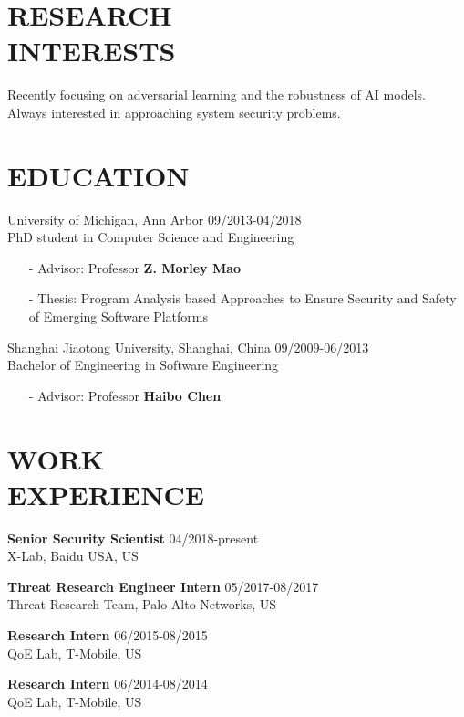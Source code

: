 \documentclass[margin]{res}
\begin{document}
\begin{resume}


\section{RESEARCH \\ INTERESTS}

Recently focusing on adversarial learning and the robustness of AI models. \\
Always interested in approaching system security problems. 

\section{EDUCATION} 
University of Michigan, Ann Arbor \hfill 09/2013-04/2018 \\
PhD student in Computer Science and Engineering
\begin{itemize}
\item[-] Advisor: Professor \textbf{Z. Morley Mao}
\item[-] Thesis: Program Analysis based Approaches to Ensure Security and Safety of Emerging Software Platforms
\end{itemize}

Shanghai Jiaotong University, Shanghai, China \hfill 09/2009-06/2013 \\
Bachelor of Engineering in Software Engineering
\begin{itemize}
\item[-] Advisor: Professor \textbf{Haibo Chen}
\end{itemize}

\section{WORK\\ EXPERIENCE}
\textbf{Senior Security Scientist} \hfill 04/2018-present\\
X-Lab, Baidu USA, US

\textbf{Threat Research Engineer Intern} \hfill 05/2017-08/2017 \\
Threat Research Team, Palo Alto Networks, US

\textbf{Research Intern} \hfill 06/2015-08/2015 \\
QoE Lab, T-Mobile, US

\textbf{Research Intern} \hfill 06/2014-08/2014 \\
QoE Lab, T-Mobile, US


\end{resume}
\end{document}
